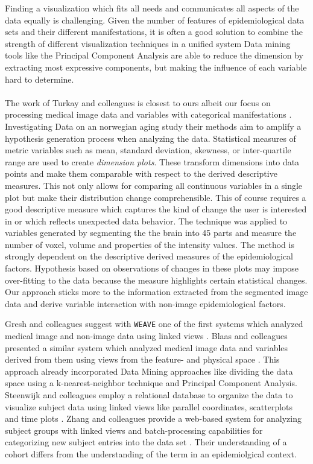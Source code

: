 \documentclass[journal]{style/vgtc}           %
\begin{document}
Finding a visualization which fits all needs and communicates all aspects of the data equally is challenging.
%
Given the number of features of epidemiological data sets and their different manifestations, it is often a good solution to combine the strength of different visualization techniques in a unified system \cite{Buja91, Konyha2009}
%
Data mining tools like the Principal Component Analysis are able to reduce the dimension by extracting most expressive components, but making the influence of each variable hard to determine.
\\\\
The work of Turkay and colleagues is closest to ours albeit our focus on processing medical image data and variables with categorical manifestations \cite{Turkay2013}.
%
Investigating Data on an norwegian aging study their methods aim to amplify a hypothesis generation process when analyzing the data.
%
Statistical measures of metric variables such as mean, standard deviation, skewness, or inter-quartile range are used to create \emph{dimension plots}.
%
These transform dimensions into data points and make them comparable with respect to the derived descriptive measures.
%
This not only allows for comparing all continuous variables in a single plot but make their distribution change comprehensible.
%
This of course requires a good descriptive measure which captures the kind of change the user is interested in or which reflects unexpected data behavior.
%
The technique was applied to variables generated by segmenting the the brain into 45 parts and measure the number of voxel, volume and properties of the intensity values.
%
The method is strongly dependent on the descriptive derived measures of the epidemiological factors.
%
Hypothesis based on observations of changes in these plots may impose over-fitting to the data because the measure highlights certain statistical changes.
%
Our approach sticks more to the information extracted from the segmented image data and derive variable interaction with non-image epidemiological factors.

Gresh and colleagues suggest with \texttt{WEAVE} one of the first systems which analyzed medical image and non-image data using linked views \cite{Gresh2000}.
%
Blaas and colleagues presented a similar system which analyzed medical image data and variables derived from them using views from the feature- and physical space \cite{Blaas2007}.
%
This approach already incorporated Data Mining approaches like dividing the data space using a k-nearest-neighbor technique and Principal Component Analysis.
%
Steenwijk and colleagues employ a relational database to organize the data to visualize subject data using linked views like parallel coordinates, scatterplots and time plots \cite{Steenwijk2010}.
%
Zhang and colleagues provide a web-based system for analyzing subject groups with linked views and batch-processing capabilities for categorizing new subject entries into the data set \cite{Zhang2012}.
%
Their understanding of a cohort differs from the understanding of the term in an epidemiolgical context.
\end{document}
